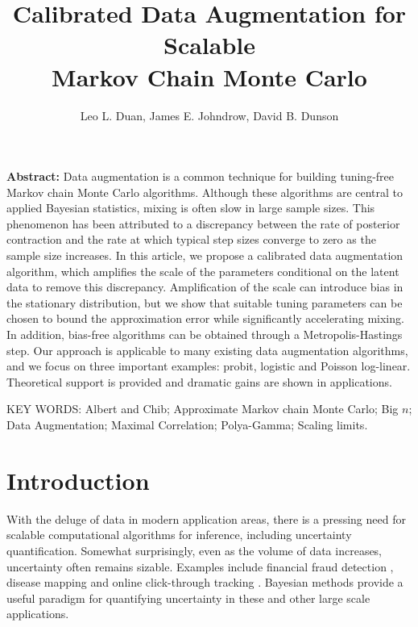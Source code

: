 \documentclass[10pt]{article}
\title
{{Calibrated Data Augmentation for Scalable \\ Markov Chain Monte Carlo}}
\author{
     Leo L. Duan,
     James E. Johndrow,
     David B. Dunson
}
\begin{document}
    
\maketitle


{\bf Abstract:} Data augmentation is a common technique for building tuning-free Markov chain Monte Carlo algorithms. Although these algorithms are central to applied Bayesian statistics, 
 mixing is often slow in large sample sizes. %
This phenomenon has been attributed to a discrepancy between the rate of posterior contraction and the rate at which typical step sizes converge to zero as the sample size increases. 
In this article, we propose a calibrated data augmentation algorithm, which amplifies the scale of the parameters conditional on the latent data to remove this discrepancy.  Amplification of the scale can introduce bias in the stationary distribution, but we show that suitable tuning parameters can be chosen to bound the approximation error while significantly accelerating mixing.  In addition, bias-free algorithms can be obtained through a Metropolis-Hastings step.  Our approach is applicable to many existing data augmentation algorithms, and we focus on three important examples: probit, logistic and Poisson log-linear. Theoretical support is provided and dramatic gains are shown in applications.
\vskip 12pt

{\noindent  KEY WORDS:  Albert and Chib; Approximate Markov chain Monte Carlo; Big $n$; Data Augmentation; Maximal Correlation; Polya-Gamma; Scaling limits.}
{}

\section{Introduction}
With the deluge of data in modern application areas, there is a pressing need for scalable computational algorithms for inference, including uncertainty quantification.  Somewhat surprisingly, even as the volume of data increases, uncertainty often remains sizable. Examples include financial fraud detection \citep{ngai2011application}, disease mapping \citep{wakefield2007disease} and online click-through tracking \citep{wang2010click}.  Bayesian methods provide a useful paradigm for quantifying uncertainty in these and other large scale applications.
\end{document}
